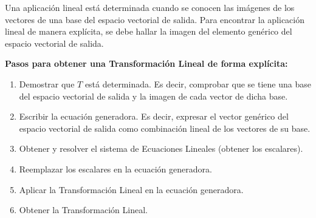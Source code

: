 \documentclass[compacto,10pt]{pubciencias-notas}
\begin{document}
\begin{obs}
    Una aplicación lineal está determinada cuando se conocen las imágenes de los vectores de una base del espacio vectorial de salida. Para encontrar la aplicación lineal de manera explícita, se debe hallar la imagen del elemento genérico del espacio vectorial de salida.
    
    \textbf{Pasos para obtener una Transformación Lineal de forma explícita:}
    \begin{enumerate}
    \item
        Demostrar que $T$ está determinada. Es decir, comprobar que se tiene una base del espacio vectorial de salida y la imagen de cada vector de dicha base.
    \item
        Escribir la ecuación generadora. Es decir, expresar el vector genérico del espacio vectorial de salida como combinación lineal de los vectores de su base.
    \item
        Obtener y resolver el sistema de Ecuaciones Lineales (obtener los escalares).
    \item
        Reemplazar los escalares en la ecuación generadora.
    \item
        Aplicar la Transformación Lineal en la ecuación generadora.
    \item
        Obtener la Transformación Lineal.
    \end{enumerate}
\end{obs}
\end{document}
